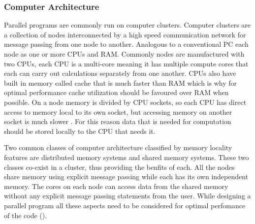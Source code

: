 \documentclass[preprint,11pt,authoryear]{elsarticle}
\begin{document}
\subsubsection{Computer Architecture}
\par Parallel programs are commonly run on computer clusters. Computer clusters are a collection of nodes interconnected by a high speed communication network for message passing from one node to another. Analogous to a conventional PC each node as one or more CPUs and RAM. Commonly nodes are manufactured with two CPUs, each CPU is a multi-core meaning it has multiple compute cores that each can carry out calculations separately from one another. CPUs also have built in memory called cache that is much faster than RAM which is why for optimal performance cache utilization should be favoured over RAM when possible. On a node memory is divided by CPU sockets, so each CPU has direct access to memory local to its own socket, but accessing memory on another socket is much slower \cite{Jin2011}. For this reason data that is needed for computation should be stored locally to the CPU that needs it.  
\par Two common classes of computer architecture classified by memory locality features are distributed memory systems and shared memory systems. These two classes co-exist in a cluster, thus providing the benfits of each. All the nodes share memory using explicit message passing while each has its own independent memory. The cores on each node can access data from the shared memory without any explicit message passing statements from the user. While designing a parallel program all these aspects need to be considered for optimal perfomance of the code (\cite{Adhianto2007}).
\end{document}
